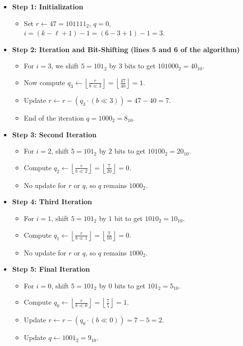 \begin{itemize}
    \item \textbf{Step 1: Initialization}
    \begin{itemize}
        \item Set $r \gets 47 = 101111_2$, $q = 0$, $i = (k-\ell +1) - 1 = (6-3+1) - 1 = 3$. 
    \end{itemize}
    
    \item \textbf{Step 2: Iteration and Bit-Shifting (lines 5 and 6 of the algorithm)}
    \begin{itemize}
        \item For $i = 3$, we shift $5 = 101_2$ by $3$ bits to get $101000_2 = 40_{10}$.
        \item Now compute $q_3 \gets \left\lfloor \frac{r}{b \ll 3} \right\rfloor = \left\lfloor \frac{47}{40} \right\rfloor = 1$.
        \item Update $r \gets r - (q_3 \cdot (b \ll 3)) = 47 - 40 = 7$.
        \item End of the iteration $q = 1000_2 = 8_{10}$.
    \end{itemize}
    
    \item \textbf{Step 3: Second Iteration}
    \begin{itemize}
        \item For $i = 2$, shift $5 = 101_2$ by $2$ bits to get $10100_2 = 20_{10}$.
        \item Compute $q_2 \gets \left\lfloor \frac{r}{b \ll 2} \right\rfloor = \left\lfloor \frac{7}{20} \right\rfloor = 0$.
        \item No update for $r$ or $q$, so $q$ remains $1000_2$.
    \end{itemize}
    
    \item \textbf{Step 4: Third Iteration}
    \begin{itemize}
        \item For $i = 1$, shift $5 = 101_2$ by $1$ bit to get $1010_2 = 10_{10}$.
        \item Compute $q_1 \gets \left\lfloor \frac{r}{b \ll 1} \right\rfloor = \left\lfloor \frac{7}{10} \right\rfloor = 0$.
        \item No update for $r$ or $q$, so $q$ remains $1000_2$.
    \end{itemize}
    
    \item \textbf{Step 5: Final Iteration}
    \begin{itemize}
        \item For $i = 0$, shift $5 = 101_2$ by $0$ bits to get $101_2 = 5_{10}$.
        \item Compute $q_0 \gets \left\lfloor \frac{r}{b \ll 0} \right\rfloor = \left\lfloor \frac{7}{5} \right\rfloor = 1$.
        \item Update $r \gets r - (q_0 \cdot (b \ll 0)) = 7 - 5 = 2$.
        \item Update $q \gets 1001_2 = 9_{10}$.
    \end{itemize}
    

\end{itemize}
